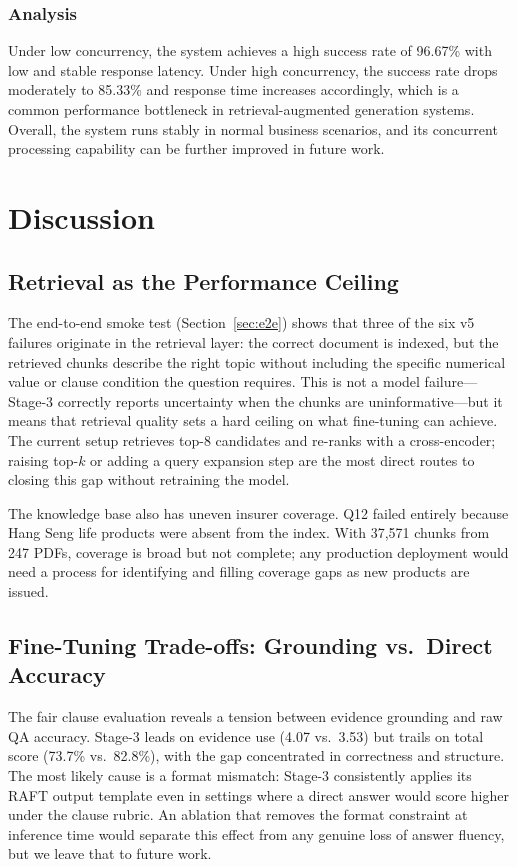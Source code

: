 \documentclass[10pt,conference]{IEEEtran}
\begin{document}
\subsubsection{Analysis}
Under low concurrency, the system achieves a high success rate of 96.67\% with low and stable response latency. Under high concurrency, the success rate drops moderately to 85.33\% and response time increases accordingly, which is a common performance bottleneck in retrieval-augmented generation systems. Overall, the system runs stably in normal business scenarios, and its concurrent processing capability can be further improved in future work.
\section{Discussion}
\label{sec:discussion}

\subsection{Retrieval as the Performance Ceiling}

The end-to-end smoke test (Section~\ref{sec:e2e}) shows that three of the six
v5 failures originate in the retrieval layer: the correct document is indexed,
but the retrieved chunks describe the right topic without including the specific
numerical value or clause condition the question requires.
This is not a model failure---Stage-3 correctly reports uncertainty when the
chunks are uninformative---but it means that retrieval quality sets a hard
ceiling on what fine-tuning can achieve.
The current setup retrieves top-8 candidates and re-ranks with a cross-encoder;
raising top-$k$ or adding a query expansion step are the most direct routes to
closing this gap without retraining the model.

The knowledge base also has uneven insurer coverage.
Q12 failed entirely because Hang Seng life products were absent from the index.
With 37,571 chunks from 247 PDFs, coverage is broad but not complete;
any production deployment would need a process for identifying and filling
coverage gaps as new products are issued.

\subsection{Fine-Tuning Trade-offs: Grounding vs.\ Direct Accuracy}

The fair clause evaluation reveals a tension between evidence grounding and
raw QA accuracy.
Stage-3 leads on evidence use (4.07 vs.\ 3.53) but trails on total score
(73.7\% vs.\ 82.8\%), with the gap concentrated in correctness and structure.
The most likely cause is a format mismatch: Stage-3 consistently applies its
RAFT output template even in settings where a direct answer would score higher
under the clause rubric.
An ablation that removes the format constraint at inference time would separate
this effect from any genuine loss of answer fluency, but we leave that to
future work.
\end{document}

